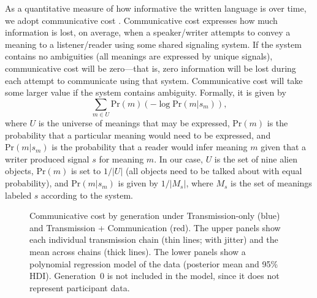 \documentclass[doc,biblatex]{apa7}
\begin{document}
As a quantitative measure of how informative the written language is over time, we adopt communicative cost \parencite{KempRegier:2012, Regier:2015, Kemp:2018}. Communicative cost expresses how much information is lost, on average, when a speaker/writer attempts to convey a meaning to a listener/reader using some shared signaling system. If the system contains no ambiguities (all meanings are expressed by unique signals), communicative cost will be zero---that is, zero information will be lost during each attempt to communicate using that system. Communicative cost will take some larger value if the system contains ambiguity. Formally, it is given by%
	\begin{equation}
	\sum_{m \in U} \mathrm{Pr}(m) ( -\log \mathrm{Pr}(m|s_m) ),
	\end{equation}
where $U$ is the universe of meanings that may be expressed, $\mathrm{Pr}(m)$ is the probability that a particular meaning would need to be expressed, and $\mathrm{Pr}(m|s_m)$ is the probability that a reader would infer meaning $m$ given that a writer produced signal $s$ for meaning $m$. In our case, $U$ is the set of nine alien objects, $\mathrm{Pr}(m)$ is set to $1/|U|$ (all objects need to be talked about with equal probability), and $\mathrm{Pr}(m|s_m)$ is given by $1/|M_s|$, where $M_s$ is the set of meanings labeled $s$ according to the system.

	\begin{figure}
	\vspace*{2pt}
	\caption{Communicative cost by generation under Transmission-only (blue) and Transmission + Communication (red). The upper panels show each individual transmission chain (thin lines; with jitter) and the mean across chains (thick lines). The lower panels show a polynomial regression model of the data (posterior mean and 95\% HDI). Generation~0 is not included in the model, since it does not represent participant data.}
	\label{cost_dif}
	\end{figure}
\end{document}
